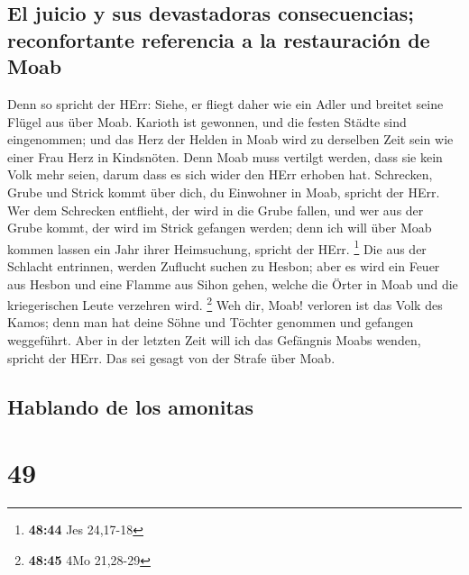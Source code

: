 \hypertarget{el-juicio-y-sus-devastadoras-consecuencias-reconfortante-referencia-a-la-restauraciuxf3n-de-moab}{%
\subsection{El juicio y sus devastadoras consecuencias; reconfortante
referencia a la restauración de
Moab}\label{el-juicio-y-sus-devastadoras-consecuencias-reconfortante-referencia-a-la-restauraciuxf3n-de-moab}}

 Denn so spricht der HErr: Siehe, er fliegt daher wie ein
Adler und breitet seine Flügel aus über Moab.  Karioth
ist gewonnen, und die festen Städte sind eingenommen; und das Herz der
Helden in Moab wird zu derselben Zeit sein wie einer Frau Herz in
Kindsnöten.  Denn Moab muss vertilgt werden, dass sie
kein Volk mehr seien, darum dass es sich wider den HErr erhoben hat.
 Schrecken, Grube und Strick kommt über dich, du
Einwohner in Moab, spricht der HErr.  Wer dem Schrecken
entflieht, der wird in die Grube fallen, und wer aus der Grube kommt,
der wird im Strick gefangen werden; denn ich will über Moab kommen
lassen ein Jahr ihrer Heimsuchung, spricht der HErr. \footnote{\textbf{48:44}
  Jes 24,17-18}  Die aus der Schlacht entrinnen, werden
Zuflucht suchen zu Hesbon; aber es wird ein Feuer aus Hesbon und eine
Flamme aus Sihon gehen, welche die Örter in Moab und die kriegerischen
Leute verzehren wird. \footnote{\textbf{48:45} 4Mo 21,28-29}
 Weh dir, Moab! verloren ist das Volk des Kamos; denn man
hat deine Söhne und Töchter genommen und gefangen weggeführt.
 Aber in der letzten Zeit will ich das Gefängnis Moabs
wenden, spricht der HErr. Das sei gesagt von der Strafe über Moab.

\hypertarget{hablando-de-los-amonitas}{%
\subsection{Hablando de los amonitas}\label{hablando-de-los-amonitas}}

\hypertarget{section-48}{%
\section{49}\label{section-48}}

